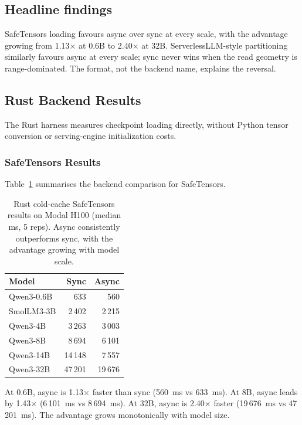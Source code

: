 \subsection{Headline findings}

SafeTensors loading favours async over sync at every scale, with the advantage growing from 1.13$\times$ at 0.6B to 2.40$\times$ at 32B. ServerlessLLM-style partitioning similarly favours async at every scale; sync never wins when the read geometry is range-dominated. The format, not the backend name, explains the reversal.

\subsection{Rust Backend Results}
\label{sec:rust-results}

The Rust harness measures checkpoint loading directly, without Python tensor conversion or serving-engine initialization costs.

\subsubsection{SafeTensors Results}

Table~\ref{tab:rust-safetensors} summarises the backend comparison for SafeTensors.

\begin{table}[htbp]
\caption{Rust cold-cache SafeTensors results on Modal H100 (median ms, 5 reps). Async consistently outperforms sync, with the advantage growing with model scale.}
\label{tab:rust-safetensors}
\centering
\begin{tabular}{lrr}
\toprule
Model & Sync & Async \\
\midrule
Qwen3-0.6B & 633 & 560 \\
SmolLM3-3B & 2\,402 & 2\,215 \\
Qwen3-4B & 3\,263 & 3\,003 \\
Qwen3-8B & 8\,694 & 6\,101 \\
Qwen3-14B & 14\,148 & 7\,557 \\
Qwen3-32B & 47\,201 & 19\,676 \\
\bottomrule
\end{tabular}
\end{table}

At 0.6B, async is 1.13$\times$ faster than sync (560~ms vs 633~ms). At 8B, async leads by 1.43$\times$ (6\,101~ms vs 8\,694~ms). At 32B, async is 2.40$\times$ faster (19\,676~ms vs 47\,201~ms). The advantage grows monotonically with model size.



